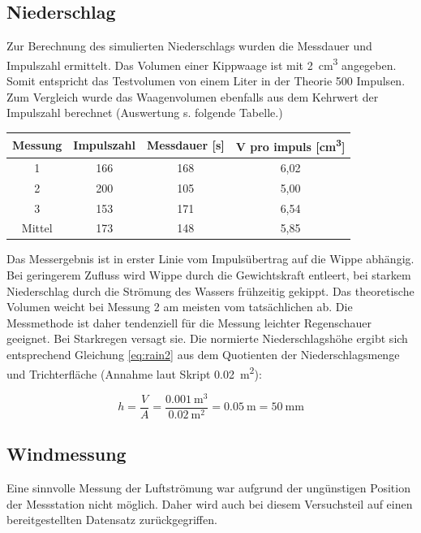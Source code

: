 		
\subsection{Niederschlag}
Zur Berechnung des simulierten Niederschlags wurden die Messdauer und Impulszahl ermittelt. Das Volumen einer Kippwaage ist mit \SI{2}{\cubic\centi\meter} angegeben. Somit entspricht das Testvolumen von einem Liter in der Theorie 500 Impulsen. Zum Vergleich wurde das Waagenvolumen ebenfalls aus dem Kehrwert der Impulszahl berechnet (Auswertung s. folgende Tabelle.)

 \begin{center}
 	\begin{tabular}{c|c|c|c}
 		\label{tab:rain}
 		\textbf{Messung} & \textbf{Impulszahl} & \textbf{Messdauer} [s] & \textbf{V pro impuls} [\si{\cubic\centi\meter}]\\
 		\hline
 		1 & 166 & 168  & 6,02\\
 		2 & 200 & 105  & 5,00\\
 		3 & 153 & 171  & 6,54\\
 		Mittel & 173 & 148  & 5,85
 	\end{tabular}
 \end{center}

Das Messergebnis ist in erster Linie vom Impulsübertrag auf die Wippe abhängig. Bei geringerem Zufluss wird Wippe durch die Gewichtskraft entleert, bei starkem Niederschlag durch die Strömung des Wassers frühzeitig gekippt. Das theoretische Volumen weicht bei Messung 2 am meisten vom tatsächlichen ab. Die Messmethode ist daher tendenziell für die Messung leichter Regenschauer geeignet. Bei Starkregen versagt sie. 
Die normierte Niederschlagshöhe ergibt sich entsprechend Gleichung \ref{eq:rain2} aus dem Quotienten der Niederschlagsmenge und Trichterfläche (Annahme laut Skript \SI{0,02}{\square\meter}):

\begin{equation}
	\label{eq:rain2}
	h = \frac{V}{A} = \frac{\SI{0,001}{\cubic\meter}}{\SI{0,02}{\square\meter}} = \SI{0,05}{\meter} = \SI{50}{\milli\meter}
\end{equation}

\subsection{Windmessung}
Eine sinnvolle Messung der Luftströmung war aufgrund der ungünstigen Position der Messstation nicht möglich. Daher wird auch bei diesem Versuchsteil auf einen bereitgestellten Datensatz zurückgegriffen.

